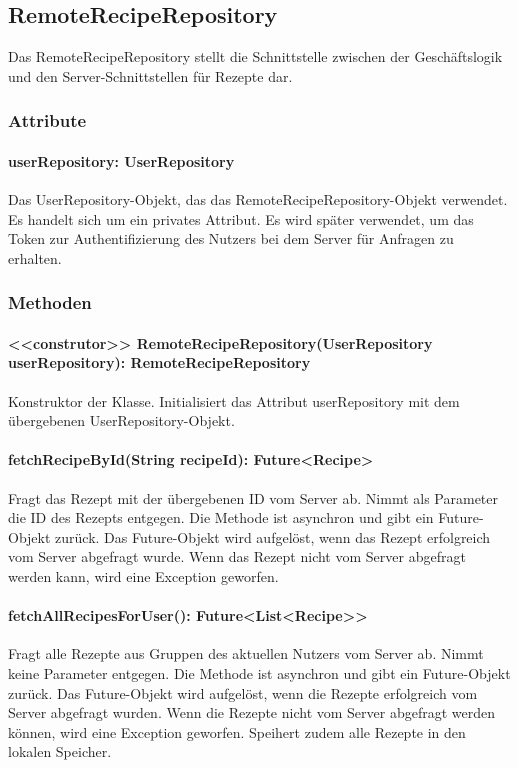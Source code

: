 \documentclass[parskip=full]{scrartcl}
\begin{document}
\subsection{RemoteRecipeRepository}
Das RemoteRecipeRepository stellt die Schnittstelle zwischen der Geschäftslogik und den Server-Schnittstellen für Rezepte dar.
\subsubsection*{Attribute}
\paragraph{userRepository: UserRepository}
Das UserRepository-Objekt, das das RemoteRecipeRepository-Objekt verwendet. Es handelt sich um ein privates Attribut. Es wird später verwendet, um das Token zur Authentifizierung des Nutzers bei dem Server für Anfragen zu erhalten.
\subsubsection*{Methoden}
\paragraph{<<construtor>> RemoteRecipeRepository(UserRepository userRepository): RemoteRecipeRepository}
Konstruktor der Klasse. Initialisiert das Attribut userRepository mit dem übergebenen UserRepository-Objekt.
\paragraph{fetchRecipeById(String recipeId): Future<Recipe>}
Fragt das Rezept mit der übergebenen ID vom Server ab. Nimmt als Parameter die ID des Rezepts entgegen. Die Methode ist asynchron und gibt ein Future-Objekt zurück. Das Future-Objekt wird aufgelöst, wenn das Rezept erfolgreich vom Server abgefragt wurde. Wenn das Rezept nicht vom Server abgefragt werden kann, wird eine Exception geworfen.
\paragraph{fetchAllRecipesForUser(): Future<List<Recipe>>}
Fragt alle Rezepte aus Gruppen des aktuellen Nutzers vom Server ab. Nimmt keine Parameter entgegen. Die Methode ist asynchron und gibt ein Future-Objekt zurück. Das Future-Objekt wird aufgelöst, wenn die Rezepte erfolgreich vom Server abgefragt wurden. Wenn die Rezepte nicht vom Server abgefragt werden können, wird eine Exception geworfen. Speihert zudem alle Rezepte in den lokalen Speicher.
\end{document}
